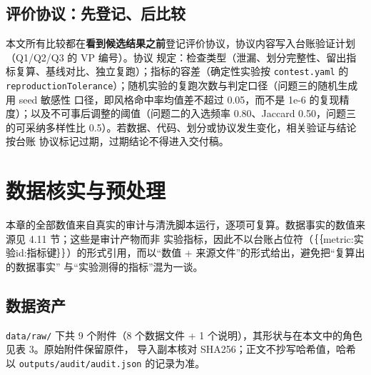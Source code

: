 \documentclass[
  a4paper,12pt]{article}
\begin{document}
\subsection{评价协议：先登记、后比较}\label{ux8bc4ux4ef7ux534fux8baeux5148ux767bux8bb0ux540eux6bd4ux8f83}

本文所有比较都在\textbf{看到候选结果之前}登记评价协议，协议内容写入台账验证计划（Q1/Q2/Q3
的 VP 编号）。协议
规定：检查类型（泄漏、划分完整性、留出指标复算、基线对比、独立复跑）；指标的容差（确定性实验按
\texttt{contest.yaml} 的
\texttt{reproductionTolerance}）；随机实验的复跑次数与判定口径（问题三的随机生成用
seed 敏感性 口径，即风格命中率均值差不超过 0.05，而不是 1e-6
的复现精度）；以及不可事后调整的阈值（问题二的入选频率 0.80、Jaccard
0.50，问题三的可采纳多样性比
0.5）。若数据、代码、划分或协议发生变化，相关验证与结论按台账
协议标记过期，过期结论不得进入交付稿。

\section{数据核实与预处理}\label{ux6570ux636eux6838ux5b9eux4e0eux9884ux5904ux7406}

本章的全部数值来自真实的审计与清洗脚本运行，逐项可复算。数据事实的数值来源见
4.11 节；这些是审计产物而非
实验指标，因此不以台账占位符（｛｛metric:实验id:指标键｝｝）的形式引用，而以``数值
+ 来源文件''的形式给出，避免把``复算出的数据事实''
与``实验测得的指标''混为一谈。

\subsection{数据资产}\label{ux6570ux636eux8d44ux4ea7}

\texttt{data/raw/} 下共 9 个附件（8 个数据文件 + 1
个说明），其形状与在本文中的角色见表 3。原始附件保留原件， 导入副本核对
SHA256；正文不抄写哈希值，哈希以 \texttt{outputs/audit/audit.json}
的记录为准。
\end{document}

